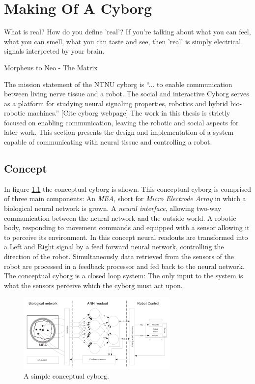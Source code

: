 \chapter{Making Of A Cyborg}
\epigraph{What is real? How do you define 'real'? If you're talking about what
you can feel, what you can smell, what you can taste and see, then 'real' is
simply electrical signals interpreted by your brain.}
{Morpheus to Neo - The Matrix}
The mission statement of the NTNU cyborg is ``... to enable communication
between living nerve tissue and a robot. The social and interactive Cyborg
serves as a platform for studying neural signaling properties, robotics and
hybrid bio-robotic machines.'' [Cite cyborg webpage]
The work in this thesis is strictly focused on enabling communication, leaving
the robotic and social aspects for later work.
This section presents the design and implementation of a system capable of
communicating with neural tissue and controlling a robot.
\section{Concept}
In figure \ref{cyborgOverviewSimple} the conceptual cyborg is shown.
This conceptual cyborg is comprised of three main components: An \emph{MEA}, short
for \emph{Micro Electrode Array} in which a biological neural network is grown.
A \emph{neural interface}, allowing two-way communication between the neural network and
the outside world.
A robotic body, responding to movement commands and equipped with a sensor
allowing it to perceive its environment.
In this concept neural readouts are transformed into a Left and Right signal by
a feed forward neural network, controlling the direction of the robot.
Simultaneously data retrieved from the sensors of the robot are processed in a
feedback processor and fed back to the neural network.
The conceptual cyborg is a closed loop system: The only input to the system is
what the sensors perceive which the cyborg must act upon.
\begin{figure}[h!]
  \centering
  \includegraphics[width=0.7\textwidth]{fig/cyborg_overview.png}
  \caption{A simple conceptual cyborg.}
  \label{cyborgOverviewSimple}
\end{figure}
